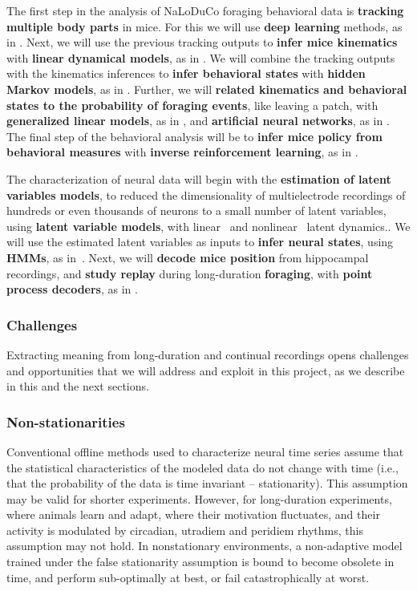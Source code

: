 \documentclass[12pt]{article}
\begin{document}
The first step in the analysis of NaLoDuCo foraging behavioral data is
\textbf{tracking multiple body parts} in mice. For this we will use
\textbf{deep learning} methods, as in
\citep{https://pubmed.ncbi.nlm.nih.gov/30127430/}.
%
Next, we will use the previous tracking outputs to \textbf{infer mice
kinematics} with \textbf{linear dynamical models}, as in
\citep{https://github.com/joacorapela/lds}.
%
We will combine the tracking outputs with the kinematics inferences to
\textbf{infer behavioral states} with \textbf{hidden Markov models}, as in
\citep{https://pubmed.ncbi.nlm.nih.gov/26687221/}.
%
Further, we will \textbf{related kinematics and behavioral states to the
probability of foraging events}, like leaving a patch, with \textbf{generalized
linear models}, as in \citep{}, and \textbf{artificial neural networks}, as in \citep{}.
%
The final step of the behavioral analysis will be to \textbf{infer mice policy
from behavioral measures} with \textbf{inverse reinforcement learning}, as in
\cite{https://arxiv.org/abs/2311.13870v2}.

The characterization of neural data will begin with the \textbf{estimation of latent
variables models}, to reduced the dimensionality of multielectrode recordings of
hundreds or even thousands of neurons to a small number of latent variables,
using \textbf{latent variable models}, with linear~\citep{dunckerAndSahanai18}
and nonlinear~\citep{pandarinathEtAl} latent dynamics..
%
We will use the estimated latent variables as inputs to
\textbf{infer neural states}, using \textbf{HMMs}, as in~\citep{}.
%
Next, we will \textbf{decode mice position} from hippocampal recordings, and
\textbf{study
replay} during long-duration \textbf{foraging}, with \textbf{point process
decoders}, as in \citep{ppDecoder}.

\subsubsection{Challenges}

Extracting meaning from long-duration and continual recordings opens
challenges and opportunities that we will address and exploit in this project,
as we describe in this and the next sections.

\subsubsection*{Non-stationarities}

Conventional offline methods used to characterize neural time series assume
that the statistical characteristics of the modeled data do not change with
time (i.e., that the probability of the data is time invariant --
stationarity). This assumption may be valid for shorter experiments. However,
for long-duration experiments, where animals learn and adapt, where their
motivation fluctuates, and their activity is modulated by circadian, utradiem
and peridiem rhythms, this assumption may not hold.
In nonstationary environments,
a non-adaptive model trained under the false stationarity
assumption is bound to become obsolete in time, and perform
sub-optimally at best, or fail catastrophically at worst.
\end{document}
